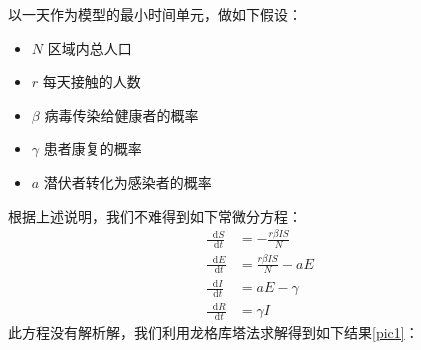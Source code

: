 \documentclass{ctexart}
\numberwithin{equation}{section}    %
\newcommand*{\dif}{\mathop{}\!\mathrm{d}}
\begin{document}
以一天作为模型的最小时间单元，做如下假设：
\begin{itemize}
    \item $N$ 区域内总人口
    \item $r$ 每天接触的人数
    \item $\beta$ 病毒传染给健康者的概率
    \item $\gamma$ 患者康复的概率
    \item $a$ 潜伏者转化为感染者的概率
\end{itemize}
根据上述说明，我们不难得到如下常微分方程：
\begin{equation}
    \begin{aligned}
        \frac{\dif S}{\dif t}&=-\frac{r \beta I S}{N} \\
        \frac{\dif E}{\dif t}&=\frac{r \beta I S}{N}-a E \\
        \frac{\dif I}{\dif t}&=a E-\gamma \\
        \frac{\dif R}{\dif t}&=\gamma I
    \end{aligned}
\end{equation}
此方程没有解析解，我们利用龙格库塔法求解得到如下结果\ref{pic1}：
\newpage
\begin{figure}[htbp]%
    \centering
    \hfill
\end{figure}
\end{document}
